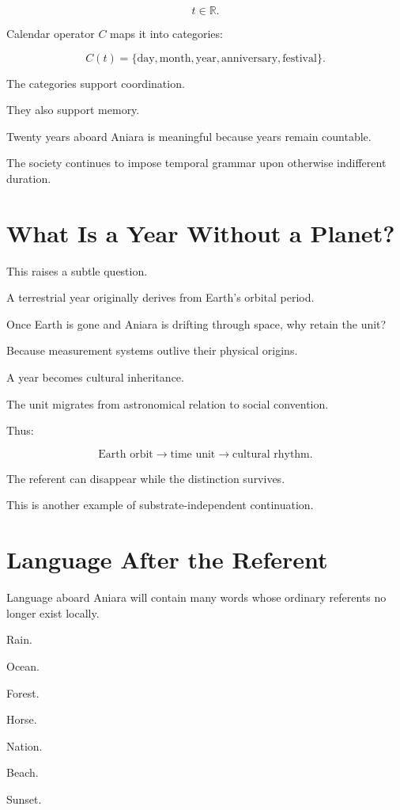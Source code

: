 \documentclass[11pt,oneside]{book}
\theoremstyle{definition}
\theoremstyle{remark}
\begin{document}
\[
t\in\mathbb R.
\]

Calendar operator \(C\) maps it into categories:

\[
C(t)
=
\{
\text{day},
\text{month},
\text{year},
\text{anniversary},
\text{festival}
\}.
\]

The categories support coordination.

They also support memory.

Twenty years aboard Aniara is meaningful because years remain countable.

The society continues to impose temporal grammar upon otherwise indifferent duration.

\section{What Is a Year Without a Planet?}

This raises a subtle question.

A terrestrial year originally derives from Earth's orbital period.

Once Earth is gone and Aniara is drifting through space, why retain the unit?

Because measurement systems outlive their physical origins.

A year becomes cultural inheritance.

The unit migrates from astronomical relation to social convention.

Thus:

\[
\text{Earth orbit}
\rightarrow
\text{time unit}
\rightarrow
\text{cultural rhythm}.
\]

The referent can disappear while the distinction survives.

This is another example of substrate-independent continuation.

\section{Language After the Referent}

Language aboard Aniara will contain many words whose ordinary referents no longer exist locally.

Rain.

Ocean.

Forest.

Horse.

Nation.

Beach.

Sunset.
\end{document}
